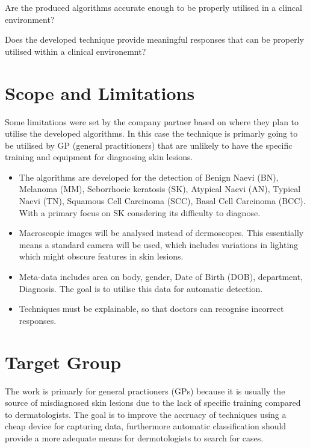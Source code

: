 \begin{itemsize}
	\item Are the produced algorithms accurate enough to be properly utilised in a clincal environment?
	\item Does the developed technique provide meaningful responses that can be properly utilised within a clinical environemnt?
\end{itemsize}

\section{Scope and Limitations}
Some limitations were set by the company partner based on where they plan to utilise the developed algorithms. In this case the technique is primarly going to be utilised by GP (general practitioners) that are unlikely to have the specific training and equipment for diagnosing skin lesions.

\begin{itemize}
	\item The algorithms are developed for the detection of Benign Naevi (BN), Melanoma (MM), Seborrhoeic keratosis (SK), Atypical Naevi (AN), Typical Naevi (TN), Squamous Cell Carcinoma (SCC), Basal Cell Carcinoma (BCC). With a primary focus on SK consdering its difficulty to diagnose.
	\item Macroscopic images will be analysed instead of dermoscopes. This essentially means a standard camera will be used, which includes variations in lighting which might obscure features in skin lesions.
	\item Meta-data includes area on body, gender, Date of Birth (DOB), department, Diagnosis. The goal is to utilise this data for automatic detection.
	\item Techniques must be explainable, so that doctors can recognise incorrect responses.
\end{itemize}

\section{Target Group}
The work is primarly for general practioners (GPs) because it is usually the source of misdiagnosed skin lesions due to the lack of specific training compared to dermatologists. The goal is to improve the accruacy of techniques using a cheap device for capturing data, furthermore automatic classification should provide a more adequate means for dermotologists to search for cases.


